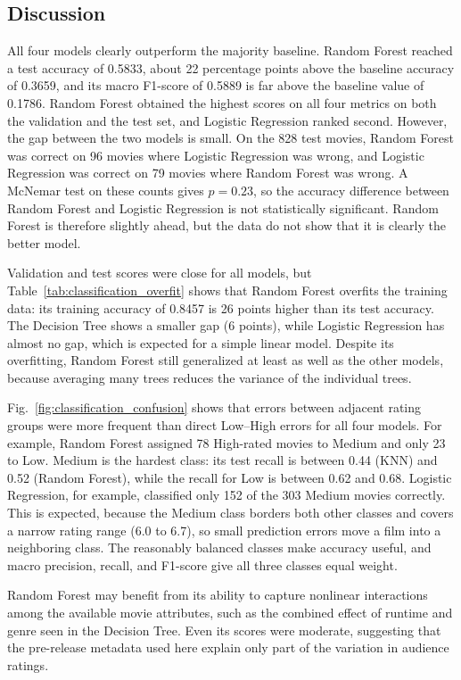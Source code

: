 \documentclass[conference]{IEEEtran}
\begin{document}
\subsection{Discussion}
All four models clearly outperform the majority baseline. Random Forest reached a test accuracy of 0.5833, about 22 percentage points above the baseline accuracy of 0.3659, and its macro F1-score of 0.5889 is far above the baseline value of 0.1786. Random Forest obtained the highest scores on all four metrics on both the validation and the test set, and Logistic Regression ranked second. However, the gap between the two models is small. On the 828 test movies, Random Forest was correct on 96 movies where Logistic Regression was wrong, and Logistic Regression was correct on 79 movies where Random Forest was wrong. A McNemar test on these counts gives $p = 0.23$, so the accuracy difference between Random Forest and Logistic Regression is not statistically significant. Random Forest is therefore slightly ahead, but the data do not show that it is clearly the better model.

Validation and test scores were close for all models, but Table~\ref{tab:classification_overfit} shows that Random Forest overfits the training data: its training accuracy of 0.8457 is 26 points higher than its test accuracy. The Decision Tree shows a smaller gap (6 points), while Logistic Regression has almost no gap, which is expected for a simple linear model. Despite its overfitting, Random Forest still generalized at least as well as the other models, because averaging many trees reduces the variance of the individual trees.

Fig.~\ref{fig:classification_confusion} shows that errors between adjacent rating groups were more frequent than direct Low--High errors for all four models. For example, Random Forest assigned 78 High-rated movies to Medium and only 23 to Low. Medium is the hardest class: its test recall is between 0.44 (KNN) and 0.52 (Random Forest), while the recall for Low is between 0.62 and 0.68. Logistic Regression, for example, classified only 152 of the 303 Medium movies correctly. This is expected, because the Medium class borders both other classes and covers a narrow rating range (6.0 to 6.7), so small prediction errors move a film into a neighboring class. The reasonably balanced classes make accuracy useful, and macro precision, recall, and F1-score give all three classes equal weight.

Random Forest may benefit from its ability to capture nonlinear interactions among the available movie attributes, such as the combined effect of runtime and genre seen in the Decision Tree. Even its scores were moderate, suggesting that the pre-release metadata used here explain only part of the variation in audience ratings.
\end{document}
